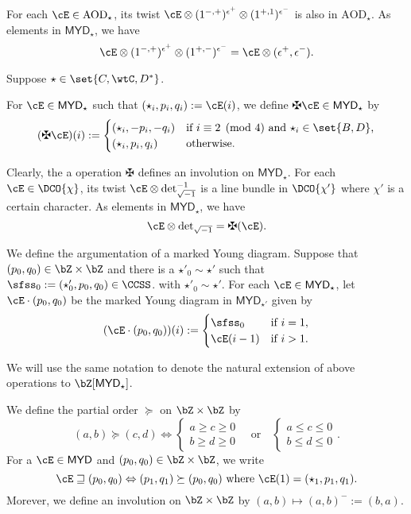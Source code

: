 \documentclass[12pt,a4paper]{amsart}
\def\MYD{{\mathsf{MYD}}}
\def\deti{{\det}_{\sqrt{-1}}}
\def\AOD{\mathrm{AOD}}
\numberwithin{equation}{section}
\theoremstyle{remark}
\begin{document}
For each $\cE\in \AOD_{\star}$, its twist
$\cE\otimes  (1^{{-,+}})^{\epsilon^{+}}\otimes (1^{+,1})^{\epsilon^{-}}$
is also  in $\AOD_{\star}$.
As elements in $\MYD_{\star}$, we have
\[
  \cE\otimes  (1^{{-,+}})^{\epsilon^{+}}\otimes (1^{+,-})^{\epsilon^{-}} = \cE \otimes (\epsilon^{+},\epsilon^{-}).
\]

\medskip

Suppose $\star\in \set{C,\wtC,D^{*}}$.

For $\cE\in \MYD_{\star}$ such that $(\star_{i},p_{i},q_{i}):=\cE(i)$,
we define $\maltese\cE\in \MYD_{\star}$ by
\[
(\maltese\cE)(i) := \begin{cases}
  (\star_{i}, -p_{i},-q_{i})& \text{if $i\equiv 2 \pmod{4}$ and $\star_{i}\in \set{B,D}$,}\\
  (\star_{i}, p_{i},q_{i}) & \text{otherwise.}
\end{cases}
\]

Clearly, the a operation $\maltese$ defines an involution on
$\MYD_{\star}$.
For each $\cE\in \DCO{\chi}$, its twist  $\cE\otimes \deti^{-1}$
is a line bundle  in $\DCO{\chi'}$ where  $\chi'$ is a certain character. %
As elements in $\MYD_{\star}$, we have
\[
  \cE\otimes \deti = \maltese (\cE).
\]

We define the argumentation of a marked Young diagram.
Suppose that $(p_{0},q_{0})\in \bZ\times \bZ$ and there is a
$\star'_{0}\sim \star'$ such that
$\sfss_{0} := (\star'_{0},p_{0},q_{0})\in \CCSS$.
with $\star'_{0} \sim \star'$.
For each $\cE\in \MYD_{\star}$,
let $\cE\cdot (p_{0},q_{0})$ be the marked Young diagram in $\MYD_{\star'}$ given by
\[
  (\cE\cdot (p_{0},q_{0}))(i) :=
  \begin{cases}
    \sfss_{0} & \text{if } i=1,\\
    \cE(i-1) & \text{if } i>1.
  \end{cases}
\]

We will use the same notation to denote the  natural extension of above
operations to $\bZ[\MYD_{\star}]$.

We define the partial order $\succeq$ on $\bZ\times \bZ$ by
\[
  (a,b) \succeq (c,d) \Leftrightarrow
  \begin{cases}a\geq c\geq 0\\ b\geq d\geq 0\end{cases}
  \quad  \text{or} \quad
  \begin{cases} a\leq c\leq 0\\ b\leq d\leq 0 \end{cases}.
\]
For a $\cE\in \MYD$ and $(p_{0},q_{0})\in \bZ\times \bZ$, we write
\[
  \cE\sqsupseteq (p_{0},q_{0}) \Leftrightarrow
  (p_{1},q_{1})\succeq (p_{0},q_{0})
  \text{ where }\cE(1) = (\star_{1},p_{1},q_{1}).
\]
Morever, we define an involution on $\bZ\times \bZ$ %
by
$(a,b)\mapsto (a,b)^{-}:=(b,a)$.
\end{document}
